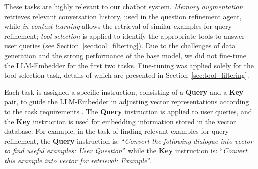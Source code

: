\documentclass[runningheads]{llncs}
\begin{document}
These tasks are highly relevant to our chatbot system. \textit{Memory augmentation} retrieves relevant conversation history, used in the question refinement agent, while \textit{in-context learning} allows the retrieval of similar examples for query refinement; \textit{tool selection} is applied to identify the appropriate tools to answer user queries (see Section~\ref{sec:tool_filtering}). Due to the challenges of data generation and the strong performance of the base model, we did not fine-tune the LLM-Embedder for the first two tasks. Fine-tuning was applied solely for the tool selection task, details of which are presented in Section~\ref{sec:tool_filtering}.


Each task is assigned a specific instruction, consisting of a \textbf{Query} and a \textbf{Key} pair, to guide the LLM-Embedder in adjusting vector representations according to the task requirements \cite{asai-etal-2023-task,DBLP:journals/corr/abs-2310-07554,INSTRUCTOR}. The \textbf{Query} instruction is applied to user queries, and the \textbf{Key} instruction is used for embedding information stored in the vector database. For example, in the task of finding relevant examples for query refinement, the \textbf{Query} instruction is: ``\textit{Convert the following dialogue into vector to find useful examples: User Question}'' while the \textbf{Key} instruction is: ``\textit{Convert this example into vector for retrieval: Example}''.
\end{document}
